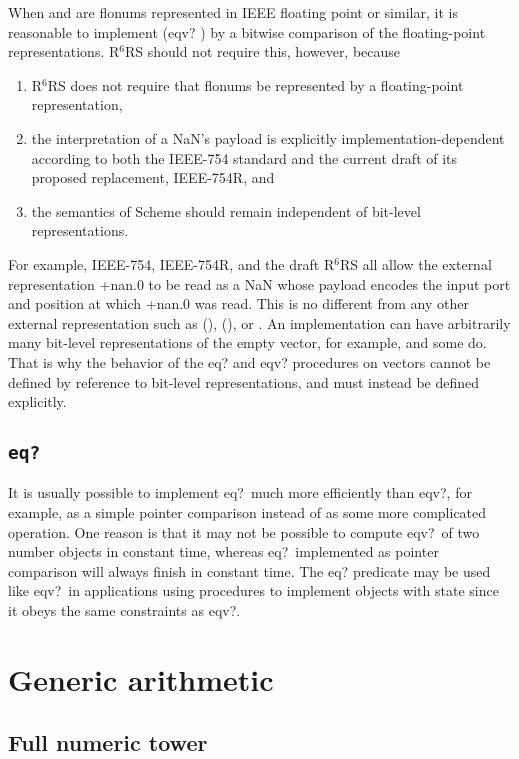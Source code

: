 \documentclass[twoside,twocolumn]{algol60}
\newcommand{\rn}[1]{R$^{#1}$RS}
\begin{document}
When  and  are flonums represented in IEEE floating
point or similar, it is reasonable to implement {\cf (eqv? 
  )} by a bitwise comparison of the floating-point
representations.  \rn{6} should not require this, however, because
%
\begin{enumerate}
\item \rn{6} does not require that flonums be represented by a
  floating-point representation,
\item the interpretation of a NaN's payload is explicitly
  implementation-dependent according to both the IEEE-754 standard and
  the current draft of its proposed replacement, IEEE-754R, and
\item the semantics of Scheme should remain independent
  of bit-level representations.
\end{enumerate}
%
For example, IEEE-754, IEEE-754R, and the draft \rn{6} all allow the
external representation {\cf +nan.0} to be read as a NaN whose payload
encodes the input port and position at which {\cf +nan.0} was read.
This is no different from any other external representation such as
{\cf ()}, {\cf \sharpsign()}, or {}.  An implementation can
have arbitrarily many bit-level representations of the empty vector,
for example, and some do.  That is why the behavior of the {\cf eq?}
and {\cf eqv?} procedures on vectors cannot be defined by reference to
bit-level representations, and must instead be defined explicitly.

\subsection{{\tt eq?}}

It is usually possible to implement {\cf eq?}\ much more efficiently
than {\cf eqv?}, for example, as a simple pointer comparison instead
of as some more complicated operation.  One reason is that it may not
be possible to compute {\cf eqv?}\ of two number objects in constant time,
whereas {\cf eq?}\ implemented as pointer comparison will always
finish in constant time.  The {\cf eq?} predicate may be used like
{\cf eqv?}\ in applications using procedures to implement objects with
state since it obeys the same constraints as {\cf eqv?}.

\section{Generic arithmetic}

\subsection{Full numeric tower}
\end{document}
